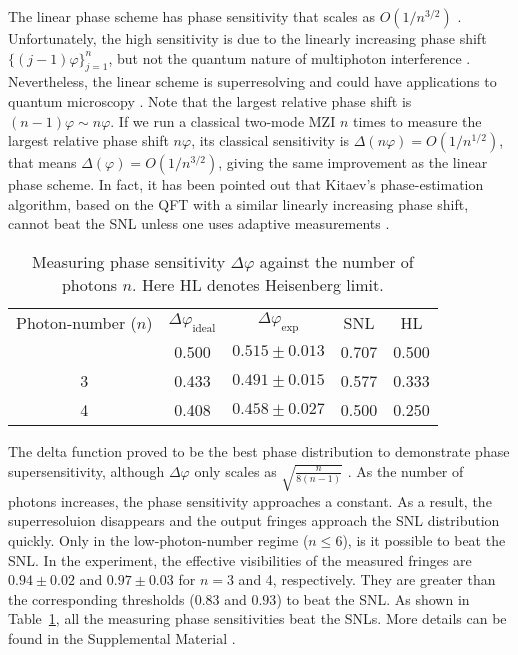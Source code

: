 \documentclass[aps,prl,twocolumn,superscriptaddress]{revtex4-1}
\begin{document}
The linear phase scheme has phase sensitivity that scales as $O(1/{n^{3/2}})$ \cite{motes2015}. Unfortunately, the high sensitivity is due to the linearly increasing phase shift $\{ (j - 1)\varphi \} _{j = 1}^n$, but not the quantum nature of multiphoton interference \cite{d1997,*soderholm2003,*chwedenczuk2013}. Nevertheless, the linear scheme is superresolving and could have applications to quantum microscopy \cite{juffmann2016multi}. Note that the largest relative phase shift is $(n - 1)\varphi \sim n\varphi$. If we run a classical two-mode MZI $n$ times to measure the largest relative phase shift $n\varphi $, its classical sensitivity is $\Delta (n\varphi ) = O(1/{n^{1/2}})$, that means $\Delta (\varphi ) = O(1/{n^{3/2}})$, giving the same improvement as the linear phase scheme. In fact, it has been pointed out that Kitaev's phase-estimation algorithm, based on the QFT with a similar linearly increasing phase shift, cannot beat the SNL unless one uses adaptive measurements \cite{higgins2007,*giovannetti2006}.

%
\begin{table}
	\caption{\label{tab:table} Measuring phase sensitivity $\Delta\varphi$ against the number of photons $n$. Here HL denotes Heisenberg limit.}
	\begin{ruledtabular}
		\begin{tabular}{ccccc}
			\textrm{Photon-number ($n$)}&
			\textrm{${\Delta \varphi_{\mbox{ideal}}}$}&
			\textrm{${\Delta \varphi_{\mbox{exp}}}$}&
			\textrm{SNL}&
			\textrm{HL}\\
			\colrule
			2 & 0.500 & $0.515 \pm 0.013$ & 0.707 & 0.500\\
			3 & 0.433 & $0.491 \pm 0.015$ & 0.577 & 0.333\\
			4 & 0.408 & $0.458 \pm 0.027$ & 0.500 & 0.250\\
		\end{tabular}
	\end{ruledtabular}
\end{table}
%

The delta function proved to be the best phase distribution to demonstrate phase supersensitivity, although $\Delta \varphi $ only scales as $\sqrt {\frac{n}{{8(n - 1)}}}$ \cite{olson2016linear}. As the number of photons increases, the phase sensitivity approaches a constant. As a result, the superresoluion disappears and the output fringes approach the SNL distribution quickly. Only in the low-photon-number regime ($n \le 6$), is it possible to beat the SNL. In the experiment, the effective visibilities of the measured fringes are $0.94 \pm 0.02$ and $0.97 \pm 0.03$ for $n=3$ and 4, respectively. They are greater than the corresponding thresholds ($0.83$ and $0.93$) to beat the SNL. As shown in Table~\ref{tab:table}, all the measuring phase sensitivities beat the SNLs. More details can be found in the Supplemental Material \cite{SUPPLEMENTALMATERIAL}.
\end{document}
